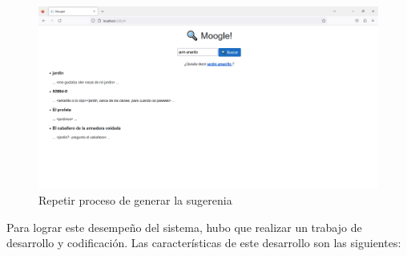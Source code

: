 \documentclass[spanish,10pt,a4paper]{article}
\begin{document}
	\begin{figure}[H]
		\centering
		\includegraphics[scale=0.35]{img5.png}
		\caption{Repetir proceso de generar la sugerenia }
		\label{fig: Figura 5}
	\end{figure}
	
	Para lograr este desempeño del sistema, hubo que realizar un trabajo de desarrollo y codificación. Las características de este desarrollo son las siguientes:
	
\end{document}
